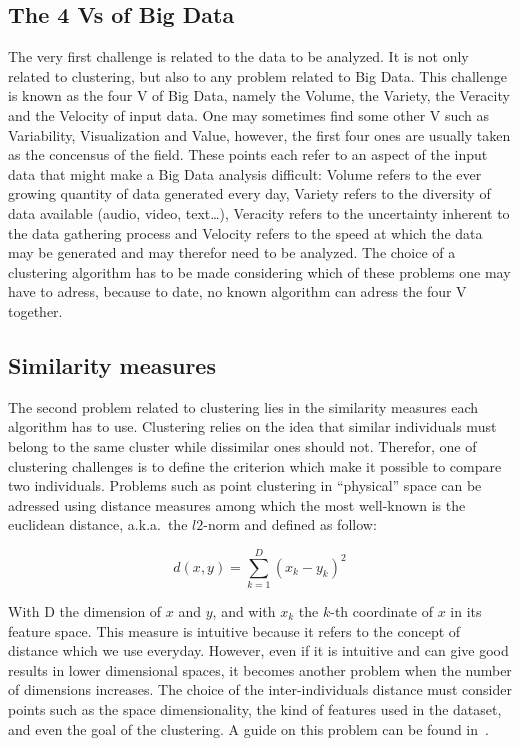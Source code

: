 \documentclass[a4paper]{report}
\begin{document}
    \subsection{The 4 Vs of Big Data}
    The very first challenge is related to the data to be analyzed. It is not only related to clustering, but also to any problem related to Big Data. This challenge is known as the four V of Big Data, namely the Volume, the Variety, the Veracity and the Velocity of input data. One may sometimes find some other V such as Variability, Visualization and Value, however, the first four ones are usually taken as the concensus of the field. These points each refer to an aspect of the input data that might make a Big Data analysis difficult: Volume refers to the ever growing quantity of data generated every day, Variety refers to the diversity of data available (audio, video, text\ldots), Veracity refers to the uncertainty inherent to the data gathering process and Velocity refers to the speed at which the data may be generated and may therefor need to be analyzed. The choice of a clustering algorithm has to be made considering which of these problems one may have to adress, because to date, no known algorithm can adress the four V together.

    \subsection{Similarity measures}
    The second problem related to clustering lies in the similarity measures each algorithm has to use. Clustering relies on the idea that similar individuals must belong to the same cluster while dissimilar ones should not. Therefor, one of clustering challenges is to define the criterion which make it possible to compare two individuals. Problems such as point clustering in ``physical'' space can be adressed using distance measures among which the most well-known is the euclidean distance, a.k.a.\ the $l2$-norm and defined as follow: 
    
    \begin{equation}
    d\left(x,y\right) = \sum_{k=1}^D {\left(x_k - y_k\right)}^2
    \end{equation}

    With D the dimension of $x$ and $y$, and with $x_k$ the $k$-th coordinate of $x$ in its feature space. This measure is intuitive because it refers to the concept of distance which we use everyday. However, even if it is intuitive and can give good results in lower dimensional spaces, it becomes another problem when the number of dimensions increases. The choice of the inter-individuals distance must consider points such as the space dimensionality, the kind of features used in the dataset, and even the goal of the clustering. A guide on this problem can be found in~\cite{domingos2012few}.
\end{document}
